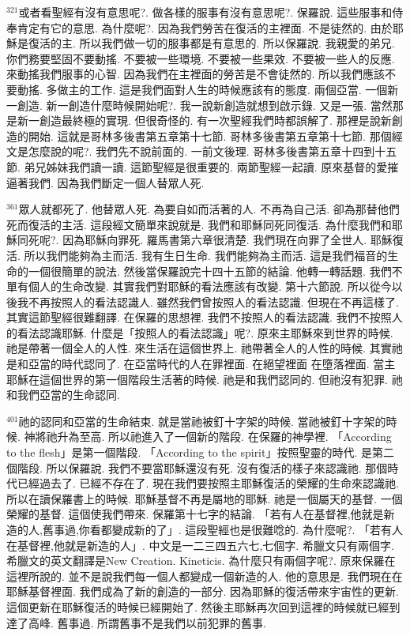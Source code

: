 \documentclass{book}
\begin{document}
$^{321}$或者看聖經有沒有意思呢?.
做各樣的服事有沒有意思呢?.
保羅說.
這些服事和侍奉肯定有它的意思.
為什麼呢?.
因為我們勞苦在復活的主裡面.
不是徒然的.
由於耶穌是復活的主.
所以我們做一切的服事都是有意思的.
所以保羅說.
我親愛的弟兄.
你們務要堅固不要動搖.
不要被一些環境.
不要被一些果效.
不要被一些人的反應.
來動搖我們服事的心智.
因為我們在主裡面的勞苦是不會徒然的.
所以我們應該不要動搖.
多做主的工作.
這是我們面對人生的時候應該有的態度.
兩個亞當.
一個新一創造.
新一創造什麼時候開始呢?.
我一說新創造就想到啟示錄.
又是一張.
當然那是新一創造最終極的實現.
但很奇怪的.
有一次聖經我們時都誤解了.
那裡是說新創造的開始.
這就是哥林多後書第五章第十七節.
哥林多後書第五章第十七節.
那個經文是怎麼說的呢?.
我們先不說前面的.
一前文後理.
哥林多後書第五章十四到十五節.
弟兄姊妹我們讀一讀.
這節聖經是很重要的.
兩節聖經一起讀.
原來基督的愛摧逼著我們.
因為我們斷定一個人替眾人死.

$^{361}$眾人就都死了.
他替眾人死.
為要自如而活著的人.
不再為自己活.
卻為那替他們死而復活的主活.
這段經文簡單來說就是.
我們和耶穌同死同復活.
為什麼我們和耶穌同死呢?.
因為耶穌向罪死.
羅馬書第六章很清楚.
我們現在向罪了全世人.
耶穌復活.
所以我們能夠為主而活.
我有生日生命.
我們能夠為主而活.
這是我們福音的生命的一個很簡單的說法.
然後當保羅說完十四十五節的結論.
他轉一轉話題.
我們不單有個人的生命改變.
其實我們對耶穌的看法應該有改變.
第十六節說.
所以從今以後我不再按照人的看法認識人.
雖然我們曾按照人的看法認識.
但現在不再這樣了.
其實這節聖經很難翻譯.
在保羅的思想裡.
我們不按照人的看法認識.
我們不按照人的看法認識耶穌.
什麼是「按照人的看法認識」呢?.
原來主耶穌來到世界的時候.
祂是帶著一個全人的人性.
來生活在這個世界上.
祂帶著全人的人性的時候.
其實祂是和亞當的時代認同了.
在亞當時代的人在罪裡面.
在絕望裡面 在墮落裡面.
當主耶穌在這個世界的第一個階段生活著的時候.
祂是和我們認同的.
但祂沒有犯罪.
祂和我們亞當的生命認同.

$^{401}$祂的認同和亞當的生命結束.
就是當祂被釘十字架的時候.
當祂被釘十字架的時候.
神將祂升為至高.
所以祂進入了一個新的階段.
在保羅的神學裡.
「According to the flesh」是第一個階段.
「According to the spirit」按照聖靈的時代.
是第二個階段.
所以保羅說.
我們不要當耶穌還沒有死.
沒有復活的樣子來認識祂.
那個時代已經過去了.
已經不存在了.
現在我們要按照主耶穌復活的榮耀的生命來認識祂.
所以在讀保羅書上的時候.
耶穌基督不再是屬地的耶穌.
祂是一個屬天的基督.
一個榮耀的基督.
這個使我們帶來.
保羅第十七字的結論.
「若有人在基督裡,他就是新造的人,舊事過,你看都變成新的了」.
這段聖經也是很難唸的.
為什麼呢?.
「若有人在基督裡,他就是新造的人」.
中文是一二三四五六七,七個字.
希臘文只有兩個字.
希臘文的英文翻譯是New Creation.
Kineticis.
為什麼只有兩個字呢?.
原來保羅在這裡所說的.
並不是說我們每一個人都變成一個新造的人.
他的意思是.
我們現在在耶穌基督裡面.
我們成為了新的創造的一部分.
因為耶穌的復活帶來宇宙性的更新.
這個更新在耶穌復活的時候已經開始了.
然後主耶穌再次回到這裡的時候就已經到達了高峰.
舊事過.
所謂舊事不是我們以前犯罪的舊事.
\end{document}
